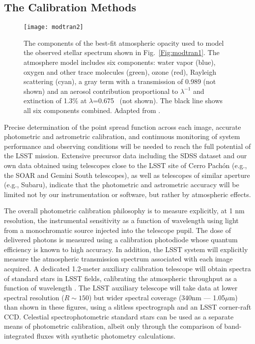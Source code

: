 \subsection{ The Calibration Methods }



\begin{figure}
\texttt{[image: modtran2]}
\caption{The components of the best-fit atmospheric opacity used to
model the observed stellar spectrum shown in Fig.~\ref{Fig:modtran1}.
The atmosphere model \citep[MODTRAN,][]{1999SPIE.3866....2A} includes six
components: water vapor (blue), oxygen and other trace molecules
(green), ozone (red), Rayleigh scattering (cyan), a gray term
with a transmission of 0.989 (not shown) and an aerosol contribution
proportional to $\lambda^{-1}$ and extinction of 1.3\% at $\lambda$=0.675 \mic\
(not shown). The black line shows all six components combined.
Adapted from \citet{2010ApJ...720..811B}.}
\label{Fig:modtran2}
\end{figure}


Precise determination of the point spread function across each image,
accurate photometric and astrometric calibration, and continuous monitoring
of system performance and observing conditions will be needed to reach the
full potential of the LSST mission. Extensive precursor data including the
SDSS dataset and our own data obtained using telescopes close to
the LSST site of Cerro Pach\'{o}n (e.g., the SOAR and Gemini South telescopes),
as well as telescopes of similar aperture (e.g., Subaru), indicate that the
photometric and astrometric accuracy will be limited not by our instrumentation
or software, but rather by atmospheric effects.


The overall photometric calibration philosophy \citep{2006ApJ...646.1436S} is to measure explicitly, at 1 nm resolution, the
instrumental sensitivity as a function of wavelength using light from a monochromatic source injected
into the telescope pupil. The dose of delivered photons is measured using a calibration photodiode whose quantum
efficiency is known to high accuracy. In addition, the LSST system will explicitly measure the atmospheric transmission
spectrum associated with each image acquired. A
dedicated 1.2-meter auxiliary calibration telescope will obtain spectra of
standard stars in LSST fields, calibrating the atmospheric throughput
as a function of wavelength  \citep[][see Figs.~\ref{Fig:modtran1} and \ref{Fig:modtran2}]{2007PASP..119.1163S}.
The LSST auxiliary telescope will take
data at lower spectral resolution ($R \sim 150$) but wider spectral
coverage (340nm --- 1.05$\mu$m) than shown in these figures, using a
slitless spectrograph and an LSST corner-raft CCD.
Celestial spectrophotometric standard stars can be used as a separate means of photometric calibration, albeit only through the
comparison of band-integrated fluxes with synthetic photometry calculations.

